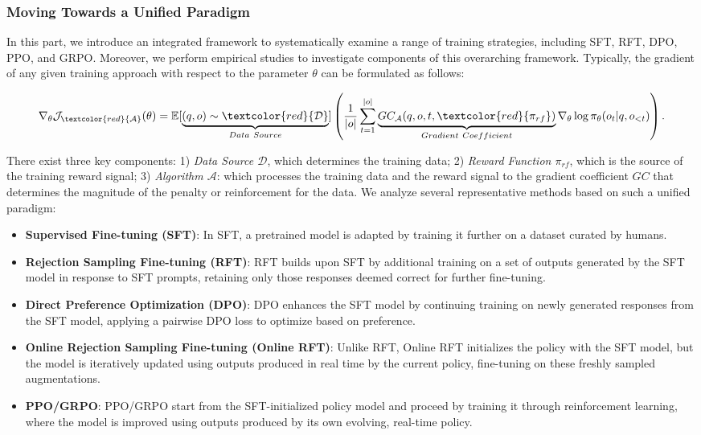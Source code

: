 \begin{itemize}[topsep=0pt]
\subsubsection{Moving Towards a Unified Paradigm} In this part, we introduce an integrated framework to systematically examine a range of training strategies, including SFT, RFT, DPO, PPO, and GRPO. Moreover, we perform empirical studies to investigate components of this overarching framework. Typically, the gradient of any given training approach with respect to the parameter $\theta$ can be formulated as follows:

\begin{equation}
    \nabla_{\theta}\mathcal{J}_{\textcolor{red}{\mathcal{A}}}(\theta) = \mathbb{E}[\underbrace{(q,o) \sim \textcolor{red}{\mathcal{D}}}_{Data \ Source}]\left( \frac{1}{|o|} \sum_{t=1}^{|o|}  \underbrace{GC_{{\mathcal{A}}}(q, o, t, \textcolor{red}{\pi_{{rf}}})}_{Gradient \ Coefficient}  \nabla_{\theta}\log \pi_{\theta}(o_t | q, o_{<t})\right).
\label{eq:objective}
\end{equation}

There exist three key components: 1) \textit{Data Source $\mathcal{D}$}, which determines the training data; 2) \textit{Reward Function $\pi_{{rf}}$}, which is the source of the training reward signal; 3) \textit{Algorithm $\mathcal{A}$}: which processes the training data and the reward signal to the gradient coefficient $GC$ that determines the magnitude of the penalty or reinforcement for the data. We analyze several representative methods based on such a unified paradigm:

\begin{itemize}
    \item  \textbf{Supervised Fine-tuning (SFT)}: In SFT, a pretrained model is adapted by training it further on a dataset curated by humans.
    \item \textbf{Rejection Sampling Fine-tuning (RFT)}: RFT builds upon SFT by additional training on a set of outputs generated by the SFT model in response to SFT prompts, retaining only those responses deemed correct for further fine-tuning.
    \item \textbf{Direct Preference Optimization (DPO)}: DPO enhances the SFT model by continuing training on newly generated responses from the SFT model, applying a pairwise DPO loss to optimize based on preference.
    \item \textbf{Online Rejection Sampling Fine-tuning (Online RFT)}: Unlike RFT, Online RFT initializes the policy with the SFT model, but the model is iteratively updated using outputs produced in real time by the current policy, fine-tuning on these freshly sampled augmentations.
    \item \textbf{PPO/GRPO}: PPO/GRPO start from the SFT-initialized policy model and proceed by training it through reinforcement learning, where the model is improved using outputs produced by its own evolving, real-time policy.
\end{itemize}


\end{itemize}
